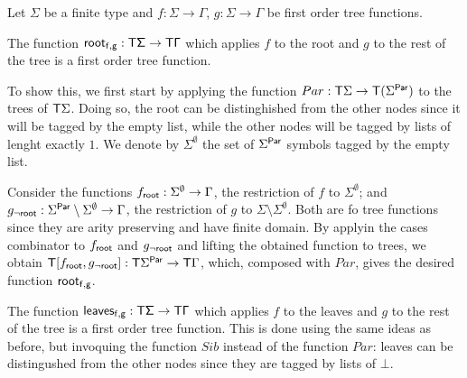 \bigskip
\noindent  \begin{example} Let $\Sigma$ be a finite type and $f:\Sigma \to \Gamma$, $g: \Sigma \to \Gamma$ be first order tree functions. 

The function $\sf{root}_{f,g} : \mathsf T\Sigma \to \mathsf T\Gamma$
which applies $f$ to the root and $g$ to the rest of the tree is a first order tree function.
 
To show this, we first start by applying the function $Par:\mathsf T\Sigma\to\mathsf T(\Sigma^{\sf{Par}})$ to the trees of $\mathsf T \Sigma$. Doing so, the root can be distinghished from the other nodes since it will be tagged by the empty list, while the other nodes will be tagged by lists of lenght exactly $1$. We denote by $\Sigma^\emptyset$ the set of $\Sigma^{\sf{Par}}$ symbols tagged by the empty list. 

Consider the functions $f_{\sf{root}}: \Sigma^\emptyset\to \Gamma$, the restriction of $f$ to $\Sigma^\emptyset$; and $g_{\neg\sf{root}}: \Sigma^{\sf{Par}}\setminus\Sigma^\emptyset\to \Gamma$, the restriction of $g$ to $\Sigma\setminus\Sigma^\emptyset$. Both are fo tree functions since they are arity preserving and have finite domain.
By applyin the cases combinator to $f_{\sf{root}}$ and $g_{\neg\sf{root}}$ and lifting the obtained function to trees, we obtain $\mathsf T{[f_{\sf{root}}, g_{\neg\sf{root}}]}: \mathsf T{\Sigma^{\sf{Par}}}\to \mathsf T \Gamma$, which, composed with $Par$, gives the desired function $\sf{root}_{f,g}$.

\medskip
The function $\sf{leaves}_{f,g} : \mathsf T\Sigma \to \mathsf T\Gamma$
 which applies $f$ to the leaves and $g$ to the rest of the tree is a first order tree function. This is done using the same ideas as before, but invoquing the function $Sib$ instead of the function $Par$: leaves can be distingushed from the other nodes since they are tagged by lists of $\bot$. \end{example}

